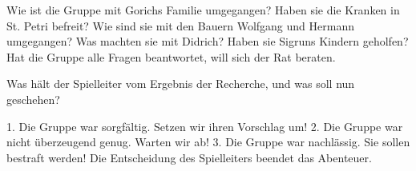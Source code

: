 Wie ist die Gruppe mit Gorichs Familie umgegangen?
Haben sie die Kranken in St. Petri befreit?
Wie sind sie mit den Bauern Wolfgang und Hermann umgegangen?
Was machten sie mit Didrich?
Haben sie Sigruns Kindern geholfen?
Hat die Gruppe alle Fragen beantwortet, will sich der Rat beraten.

Was hält der Spielleiter vom Ergebnis der Recherche, und was soll nun geschehen?

1. Die Gruppe war sorgfältig. Setzen wir ihren Vorschlag um!
2. Die Gruppe war nicht überzeugend genug. Warten wir ab!
3. Die Gruppe war nachlässig. Sie sollen bestraft werden!
Die Entscheidung des Spielleiters beendet das Abenteuer.
